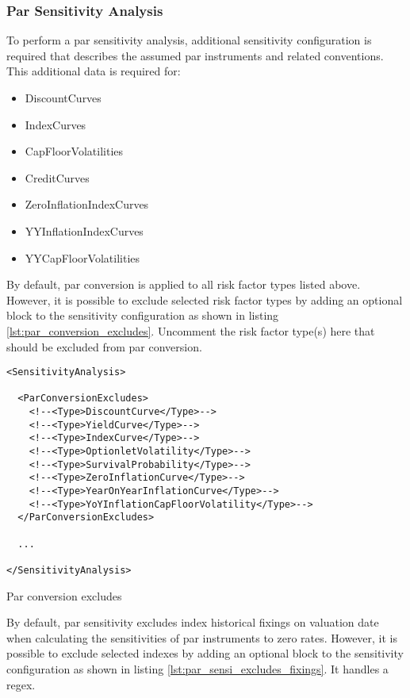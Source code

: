\subsubsection*{Par Sensitivity Analysis}

To perform a par sensitivity analysis, additional sensitivity configuration is required that describes the assumed par instruments and related conventions.
This additional data is required for:
\begin{itemize}
\item DiscountCurves
\item IndexCurves
\item CapFloorVolatilities
\item CreditCurves
\item ZeroInflationIndexCurves
\item YYInflationIndexCurves
\item YYCapFloorVolatilities
\end{itemize}

By default, par conversion is applied to all risk factor types listed above. However, it is possible to exclude
selected risk factor types by adding an optional block to the sensitivity configuration as shown in listing \ref{lst:par_conversion_excludes}. Uncomment the risk factor type(s) here that should be excluded from par conversion.

\begin{longlisting}
  \begin{verbatim}
<SensitivityAnalysis>

  <ParConversionExcludes>
    <!--<Type>DiscountCurve</Type>-->
    <!--<Type>YieldCurve</Type>-->
    <!--<Type>IndexCurve</Type>-->
    <!--<Type>OptionletVolatility</Type>-->
    <!--<Type>SurvivalProbability</Type>-->
    <!--<Type>ZeroInflationCurve</Type>-->
    <!--<Type>YearOnYearInflationCurve</Type>-->
    <!--<Type>YoYInflationCapFloorVolatility</Type>-->
  </ParConversionExcludes>

  ...
  
</SensitivityAnalysis>
\end{verbatim}
\caption{Par conversion excludes}
\label{lst:par_conversion_excludes}
\end{longlisting}

By default, par sensitivity excludes index historical fixings on valuation date when calculating the sensitivities of par instruments to zero rates. However, it is possible to exclude
selected indexes by adding an optional block to the sensitivity configuration as shown in listing \ref{lst:par_sensi_excludes_fixings}. It handles a regex.

